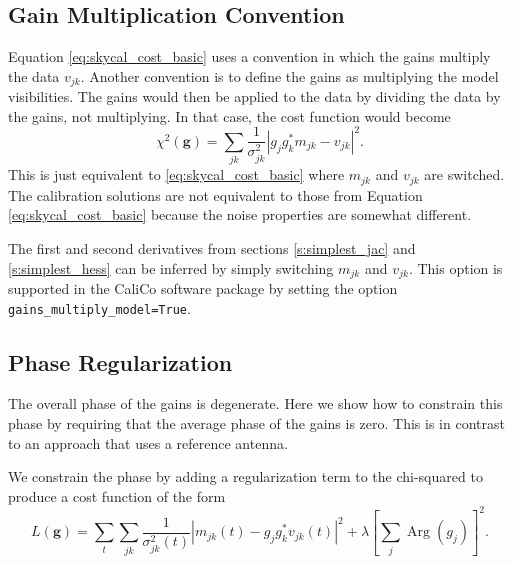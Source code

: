 \documentclass{article}
\begin{document}
\subsection{Gain Multiplication Convention}

Equation \ref{eq:skycal_cost_basic} uses a convention in which the gains multiply the data $v_{jk}$. Another convention is to define the gains as multiplying the model visibilities. The gains would then be applied to the data by dividing the data by the gains, not multiplying. In that case, the cost function would become
\begin{equation}
    \chi^2(\boldsymbol{g}) = \sum_{jk} \frac{1}{\sigma_{jk}^2} \left| g_j g_k^* m_{jk} - v_{jk} \right|^2.
\end{equation}
This is just equivalent to \ref{eq:skycal_cost_basic} where $m_{jk}$ and $v_{jk}$ are switched. The calibration solutions are not equivalent to those from Equation \ref{eq:skycal_cost_basic} because the noise properties are somewhat different.

The first and second derivatives from sections \ref{s:simplest_jac} and \ref{s:simplest_hess} can be inferred by simply switching $m_{jk}$ and $v_{jk}$. This option is supported in the CaliCo software package by setting the option \texttt{gains\_multiply\_model=True}.


\subsection{Phase Regularization}
\label{s:phase_regularization}

The overall phase of the gains is degenerate. Here we show how to constrain this phase by requiring that the average phase of the gains is zero. This is in contrast to an approach that uses a reference antenna.

We constrain the phase by adding a regularization term to the chi-squared to produce a cost function of the form
\begin{equation}
    L(\boldsymbol{g}) = \sum_t \sum_{jk} \frac{1}{\sigma_{jk}^2(t)} \left| m_{jk}(t) - g_j g_k^* v_{jk}(t) \right|^2 + \lambda \left[ \sum_j \operatorname{Arg}(g_j) \right]^2.
\end{equation}
\end{document}
